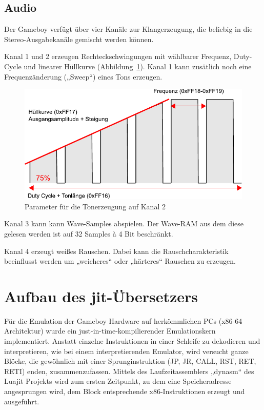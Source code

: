 \documentclass[a4paper]{scrartcl}
\begin{document}
\subsection{Audio}

Der Gameboy verfügt über vier Kanäle zur Klangerzeugung, die beliebig in die Stereo-Ausgabekanäle gemischt werden können.

Kanal 1 und 2 erzeugen Rechteckschwingungen mit wählbarer Frequenz, Duty-Cycle und linearer Hüllkurve (Abbildung~\ref{img:sound}). Kanal 1 kann zusätlich noch eine Frequenzänderung („Sweep“) eines Tons erzeugen.

\begin{figure}[htbp]
\centering
\includegraphics[width=0.9\linewidth]{img/sound}
\caption{Parameter für die Tonerzeugung auf Kanal 2}
\label{img:sound}
\end{figure}

Kanal 3 kann kann Wave-Samples abspielen. Der Wave-RAM aus dem diese gelesen werden ist auf 32 Samples à 4 Bit beschränkt.

Kanal 4 erzeugt weißes Rauschen. Dabei kann die Rauschcharakteristik beeinflusst werden um „weicheres“ oder „härteres“ Rauschen zu erzeugen.
\section{Aufbau des jit-Übersetzers}

Für die Emulation der Gameboy Hardware auf herkömmlichen PCs (x86-64 Architektur) wurde ein just-in-time-kompilierender Emulationskern implementiert. Anstatt einzelne Instruktionen in einer Schleife zu dekodieren und interpretieren, wie bei einem interpretierenden Emulator, wird versucht ganze Blöcke, die gewöhnlich mit einer Sprunginstruktion (JP, JR, CALL, RST, RET, RETI) enden, zusammenzufassen. Mittels des Laufzeitassemblers „dynasm“ des Luajit Projekts wird zum ersten Zeitpunkt, zu dem eine Speicheradresse angesprungen wird, dem Block entsprechende x86-Instruktionen erzeugt und ausgeführt.
\end{document}
